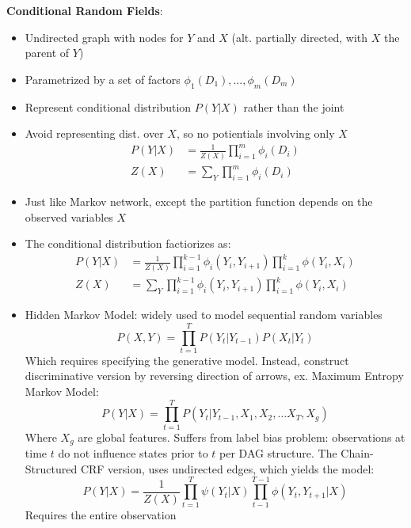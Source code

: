 \documentclass{article}
\begin{document}
\textbf{Conditional Random Fields}: 
\begin{itemize}
    \item Undirected graph with nodes for $Y$ and $X$ (alt. partially directed, with $X$ the parent of $Y$)
    \item Parametrized by a set of factors $\phi_1(D_1), \dots , \phi_m(D_m)$
    \item Represent conditional distribution $P(Y|X)$ rather than the joint 
    \item Avoid representing dist. over $X$, so no potientials involving only $X$ \begin{align*}
        P(Y|X) &= \frac{1}{Z(X)}\prod_{i = 1}^{m}\phi_i(D_i) \\
        Z(X) &= \sum_{Y}\prod_{i = 1}^{m}\phi_i(D_i)
    \end{align*}
    \item Just like Markov network, except the partition function depends on the observed variables $X$
    \item The conditional distribution factiorizes as: \begin{align*}
        P(Y|X) &= \frac{1}{Z(X)}\prod_{i = 1}^{k - 1}\phi_i(Y_i, Y_{i + 1})\prod_{i = 1}^{k}\phi(Y_i, X_i) \\
        Z(X) &= \sum_{Y}\prod_{i = 1}^{k - 1}\phi_i(Y_i, Y_{i + 1})\prod_{i = 1}^{k}\phi(Y_i, X_i)
    \end{align*}
    \item Hidden Markov Model: widely used to model sequential random variables \begin{equation*}
        P(X, Y) = \prod_{t = 1}^{T}P(Y_t | Y_{t - 1})P(X_t | Y_t)
    \end{equation*} Which requires specifying the generative model. Instead, construct discriminative version by reversing direction of arrows, ex. Maximum Entropy Markov Model: \begin{equation*}
        P(Y|X) = \prod_{t = 1}^{T}P(Y_t|Y_{t - 1},X_1, X_2, \dots X_T, X_g)
    \end{equation*}
    Where $X_g$ are global features. Suffers from label bias problem: observations at time $t$ do not influence states prior to $t$ per DAG structure. The Chain-Structured CRF version, uses undirected edges, which yields the model: 
    \begin{equation*}
        P(Y|X) = \frac{1}{Z(X)}\prod_{t = 1}^T \psi(Y_t|X) \prod_{t - 1}^{T - 1}\phi(Y_t, Y_{t + 1}| X)
    \end{equation*} Requires the entire observation

\end{itemize}
\end{document}
